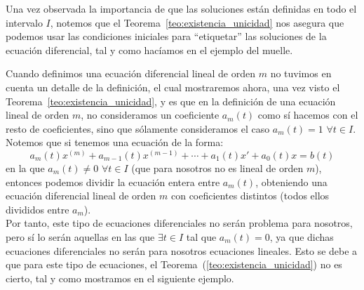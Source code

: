 Una vez observada la importancia de que las soluciones están definidas en todo el intervalo $I$, notemos que el Teorema~\ref{teo:existencia_unicidad} nos asegura que podemos usar las condiciones iniciales para ``etiquetar'' las soluciones de la ecuación diferencial, tal y como hacíamos en el ejemplo del muelle.\\

\begin{observacion}
    Cuando definimos una ecuación diferencial lineal de orden $m$ no tuvimos en cuenta un detalle de la definición, el cual mostraremos ahora, una vez visto el Teorema~\ref{teo:existencia_unicidad}, y es que en la definición de una ecuación lineal de orden $m$, no consideramos un coeficiente $a_m(t)$ como sí hacemos con el resto de coeficientes, sino que sólamente consideramos el caso $a_m(t) = 1$ $\forall t\in I$.\\

    Notemos que si tenemos una ecuación de la forma:
    \begin{equation*}
        a_m(t)x^{(m)} + a_{m-1}(t) x^{(m-1)} + \cdots + a_1(t)x' + a_0(t)x = b(t)
    \end{equation*}
    en la que $a_m(t) \neq 0$ $\forall t\in I$ (que para nosotros no es lineal de orden $m$), entonces podemos dividir la ecuación entera entre $a_m(t)$, obteniendo una ecuación diferencial lineal de orden $m$ con coeficientes distintos (todos ellos divididos entre $a_m$).\\

    Por tanto, este tipo de ecuaciones diferenciales no serán problema para nosotros, pero sí lo serán aquellas en las que $\exists t\in I$ tal que $a_m(t) = 0$, ya que dichas ecuaciones diferenciales no serán para nosotros ecuaciones lineales. Esto se debe a que para este tipo de ecuaciones, el Teorema~(\ref{teo:existencia_unicidad}) no es cierto, tal y como mostramos en el siguiente ejemplo.
\end{observacion}

